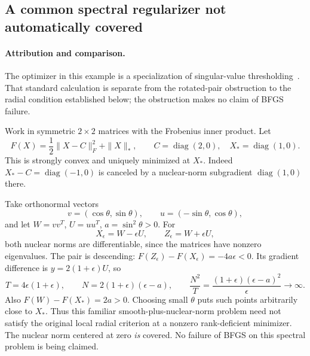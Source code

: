 \subsection{A common spectral regularizer not automatically covered}
\paragraph{Attribution and comparison.}
The optimizer in this example is a specialization of singular-value thresholding~\cite[Theorem~2.1]{CCS10}. That standard calculation is separate from the rotated-pair obstruction to the radial condition established below; the obstruction makes no claim of BFGS failure.

Work in symmetric $2\times2$ matrices with the Frobenius inner product. Let
\[
 F(X)=\frac12\|X-C\|_F^2+\|X\|_*,\qquad
 C=\operatorname{diag}(2,0),\quad X_*=\operatorname{diag}(1,0).
\]
This is strongly convex and uniquely minimized at $X_*$. Indeed $X_*-C=\operatorname{diag}(-1,0)$ is canceled by a nuclear-norm subgradient $\operatorname{diag}(1,0)$ there.

Take orthonormal vectors
\[
 v=(\cos\theta,\sin\theta),\qquad u=(-\sin\theta,\cos\theta),
\]
and let $W=vv^T$, $U=uu^T$, $a=\sin^2\theta>0$. For
\[
 X_\epsilon=W-\epsilon U,\qquad Z_\epsilon=W+\epsilon U,
\]
both nuclear norms are differentiable, since the matrices have nonzero eigenvalues. The pair is descending: $F(Z_\epsilon)-F(X_\epsilon)=-4a\epsilon<0$. Its gradient difference is $y=2(1+\epsilon)U$, so
\[
 T=4\epsilon(1+\epsilon),\qquad
 N=2(1+\epsilon)(\epsilon-a),\qquad
 \frac{N^2}{T}=\frac{(1+\epsilon)(\epsilon-a)^2}{\epsilon}\to\infty.
\]
Also $F(W)-F(X_*)=2a>0$. Choosing small $\theta$ puts such points arbitrarily close to $X_*$. Thus this familiar smooth-plus-nuclear-norm problem need not satisfy the original local radial criterion at a nonzero rank-deficient minimizer. The nuclear norm centered at zero \emph{is} covered. No failure of BFGS on this spectral problem is being claimed.


\endgroup
